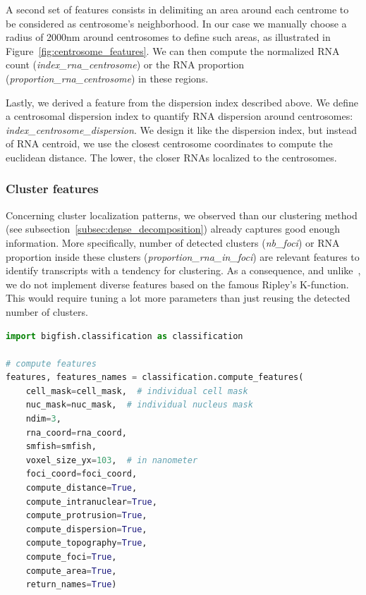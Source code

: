 A second set of features consists in delimiting an area around each centrome to be considered as centrosome's neighborhood.
In our case we manually choose a radius of 2000nm around centrosomes to define such areas, as illustrated in Figure~\ref{fig:centrosome_features}.
We can then compute the normalized \ac{RNA} count (\emph{index\_rna\_centrosome}) or the \ac{RNA} proportion (\emph{proportion\_rna\_centrosome}) in these regions.

Lastly, we derived a feature from the dispersion index described above.
We define a centrosomal dispersion index to quantify \ac{RNA} dispersion around centrosomes: \emph{index\_centrosome\_dispersion}.
We design it like the dispersion index, but instead of \ac{RNA} centroid, we use the closest centrosome coordinates to compute the euclidean distance.
The lower, the closer \ac{RNA}s localized to the centrosomes.

\subsubsection{Cluster features}

Concerning cluster localization patterns, we observed than our clustering method (see subsection~\ref{subsec:dense_decomposition}) already captures good enough information.
More specifically, number of detected clusters (\emph{nb\_foci}) or \ac{RNA} proportion inside these clusters (\emph{proportion\_rna\_in\_foci}) are relevant features to identify transcripts with a tendency for clustering.
As a consequence, and unlike~\cite{samacoits_computational_2018}, we do not implement diverse features based on the famous Ripley's K-function.
This would require tuning a lot more parameters than just reusing the detected number of clusters.\\

\begin{minipage}{0.9\textwidth}
\begin{lstlisting}[language=Python]
import bigfish.classification as classification

# compute features
features, features_names = classification.compute_features(
    cell_mask=cell_mask,  # individual cell mask
	nuc_mask=nuc_mask,  # individual nucleus mask
	ndim=3,
	rna_coord=rna_coord,
    smfish=smfish,
	voxel_size_yx=103,  # in nanometer
    foci_coord=foci_coord,
    compute_distance=True,
    compute_intranuclear=True,
    compute_protrusion=True,
    compute_dispersion=True,
    compute_topography=True,
    compute_foci=True,
    compute_area=True,
    return_names=True)
\end{lstlisting}
\end{minipage}

